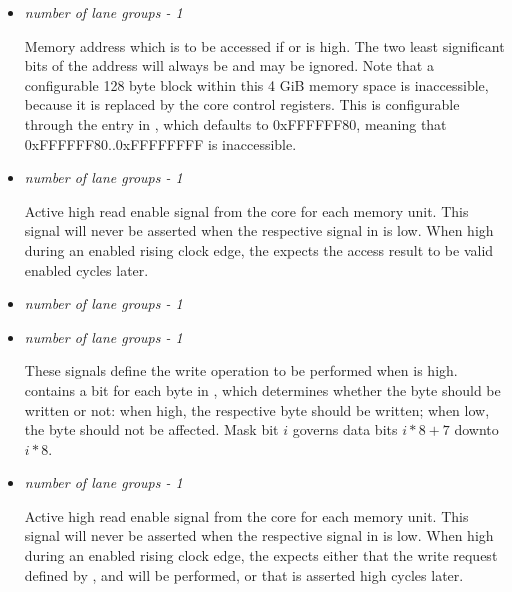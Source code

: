 \documentclass[main.tex]{subfiles}
\begin{document}
\begin{itemize}
  
  \item {}\textit{number of lane groups - 1}
  
  Memory address which is to be accessed if  or  is high. The two least significant bits of the address will always be  and may be ignored. Note that a configurable 128 byte block within this 4 GiB memory space is inaccessible, because it is replaced by the core control registers. This is configurable through the  entry in , which defaults to 0xFFFFFF80, meaning that 0xFFFFFF80..0xFFFFFFFF is inaccessible.
  
  \vspace{1em}
  \item {}\textit{number of lane groups - 1}
  
  Active high read enable signal from the core for each memory unit. This signal will never be asserted when the respective signal in  is low. When high during an enabled rising clock edge, the \rvex{} expects the access result to be valid  enabled cycles later.
  
  \vspace{1em}
  \item {}\textit{number of lane groups - 1}
  \item {}\textit{number of lane groups - 1}
  
  These signals define the write operation to be performed when  is high.  contains a bit for each byte in , which determines whether the byte should be written or not: when high, the respective byte should be written; when low, the byte should not be affected. Mask bit $i$ governs data bits $i*8+7$ downto $i*8$.

  \vspace{1em}
  \item {}\textit{number of lane groups - 1}
  
  Active high read enable signal from the core for each memory unit. This signal will never be asserted when the respective signal in  is low. When high during an enabled rising clock edge, the \rvex{} expects either that the write request defined by ,  and  will be performed, or that  is asserted high  cycles later.


\end{itemize}
\end{document}
